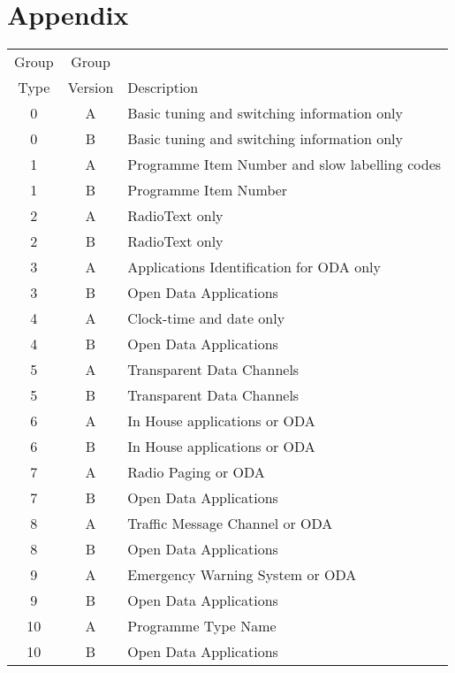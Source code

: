 \chapter{Appendix}\label{ch:Appendix}
\glsresetall %


\begin{table}
	\begin{center}
		\begin{tabular}{ c c l }
		 Group & Group & \\
		 Type & Version & Description \\\hline
		 0 & A & Basic tuning and switching information only \\
		 0 & B & Basic tuning and switching information only \\
		 1 & A & Programme Item Number and slow labelling codes\\
		 1 & B & Programme Item Number \\
		 2 & A & RadioText only \\
		 2 & B & RadioText only \\
		 3 & A & Applications Identification for ODA only \\
		 3 & B & Open Data Applications\\
		 4 & A & Clock-time and date only \\
		 4 & B & Open Data Applications\\
		 5 & A & Transparent Data Channels \\
		 5 & B & Transparent Data Channels \\
		 6 & A & In House applications or ODA \\
		 6 & B & In House applications or ODA \\
		 7 & A & Radio Paging or ODA \\
		 7 & B & Open Data Applications\\
		 8 & A & Traffic Message Channel or ODA \\
		 8 & B & Open Data Applications\\
		 9 & A & Emergency Warning System or ODA \\
		 9 & B & Open Data Applications\\
		10 & A & Programme Type Name\\
		10 & B & Open Data Applications\\

\end{tabular}
\end{center}
\end{table}
